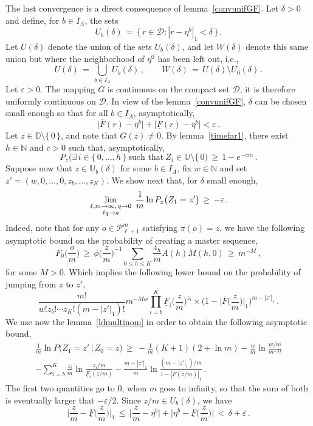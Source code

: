 \documentclass[a4paper,12pt]{article}
\theoremstyle{definition}
\theoremstyle{remark}
\def \cD {\mathcal{D}}
\def \cP {\mathcal{P}}
\def \d {\delta}
\def \e {\varepsilon}
\def \dD {\mathbb{D}}
\def \N {\mathbb{N}}
\def \dU {\mathbb{U}}
\def \pml {\cP^m_{\ell +1}}
\def\lmqq {{\genfrac{}{}{0pt}{1}{\ell,m\to\infty,\,q\to0}{\ell q\to a}}}
\begin{document}
The last convergence is a direct consequence of lemma~\ref{convunifGF}.
Let $\d>0$ and define, for $b\in I_A$, the sets
$$U_b(\d)\,=\,\big\lbrace\,
r\in\cD:|r-\eta^b|_1<\d
\,\big\rbrace\,.$$
Let $U(\d)$ denote the union of the sets $U_b(\d)$,
and let $W(\d)$ denote this same union but where
the neighborhood of $\eta^0$ has been left out,
i.e.,
$$
U(\d)\,=\,\bigcup_{b\in I_A} U_b(\d)\,,\qquad
W(\d)\,=\,U(\d)\setminus U_0(\d)\,.$$
Let $\e>0$.
The mapping $G$ is continuous on the compact set $\cD$,
it is therefore uniformly continuous on $\cD$.
In view of the lemma~\ref{convunifGF},
$\d$ can be chosen small enough so that 
for all $b\in I_A$, asymptotically,
$$\big|
\overline{F}(r)-\eta^b
\big|+\big|
\underline{F}(r)-\eta^b
\big|<\e\,.$$
Let $z\in\dD\setminus\lbrace\,0\,\rbrace$,
and note that $G(z)\neq 0$.
By lemma~\ref{timefar1}, 
there exist $h\in\N$ and $c>0$ such that, asymptotically,
$$P_z\big(
\exists\, i\in\lbrace\,0,\dots,h\,\rbrace\ \text{such that}\
Z_i\in\dU\setminus\lbrace\,0
\big)\,\geq\,1-e^{-cm}\,.$$
Suppose now that $z\in\dU_b(\d)$ for some $b\in I_A$,
fix $w\in\N$ and set
$z'=(w,0,\dots,0,z_b,\dots,z_K)$.
We show next that,
for $\d$ small enough,
$$\lim_\lmqq\,\frac{1}{m}\ln
P_{z}\big(
Z_1=z'
\big)\,\geq\,-\e\,.$$
Indeed, note that for any $o\in\pml$ satisfying $\pi(o)=z$,
we have the following asymptotic bound on the probability 
of creating a master sequence,
$$
F_0\Big(
\frac{o}{m}
\Big)\,\geq\,\phi\Big(
\frac{z}{m}
\Big)^{-1}
\sum_{0\leq h\leq K}\frac{z_h}{m}A(h)M(h,0)
\,\geq\,m^{-M}\,,
$$
for some $M>0$.
Which implies the following lower bound
on the probability of jumping from $z$ to $z'$,
$$
\frac{m!}{w!z_b!\cdots z_K!(m-|z'|_1)!}
m^{-Mw}\prod_{i=b}^K
\underline{F}_i\Big(
\frac{z}{m}\Big)^{z_i}\times
\bigg(
1-\Big|
\overline{F}\Big(
\frac{z}{m}
\Big)
\Big|_1
\bigg)^{m-|z'|_1}\,.
$$
We use now the lemma~\ref{ldmultinom}
in order to obtain the following asymptotic bound,
\begin{multline*}
\frac{1}{m}\ln 
P\big(
Z_1=z'\,\big|\,Z_0=z
\big)\,\geq\,
-\frac{1}{m}(K+1)(2+\ln m)
-\frac{w}{m}\ln\frac{w/m}{m^{-M}}\\
-\sum_{i=b}^K\frac{z_i}{m}\ln\frac{z_i/m}{\underline{F}_i(z/m)}
-\frac{m-|z'|_1}{m}\ln\frac{(m-|z'|_1)/m}{1-|\overline{F}(z/m)|_1}
\,.\end{multline*}
The first two quantities go to $0$, when $m$ goes to infinity,
so that the sum of both is eventually larger that $-\e/2$.
Since $z/m\in U_b(\d)$,
we have
$$\Big|
\frac{z}{m}-\underline{F}\Big(
\frac{z}{m}
\Big)
\Big|_1\,\leq\,
\Big|
\frac{z}{m}-\eta^b
\Big|+\Big|
\eta^b-\underline{F}\Big(
\frac{z}{m}
\Big)
\Big|\,<\,\d+\e\,.$$
\end{document}
